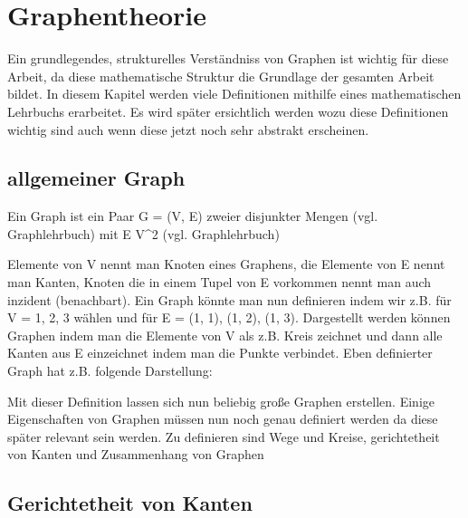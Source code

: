 \section{Graphentheorie}

Ein grundlegendes, strukturelles Verständniss von Graphen ist wichtig für diese Arbeit, da diese mathematische Struktur
die Grundlage der gesamten Arbeit bildet. In diesem Kapitel werden viele Definitionen mithilfe eines mathematischen
Lehrbuchs erarbeitet. Es wird später ersichtlich werden wozu diese Definitionen wichtig sind auch wenn diese jetzt noch
sehr abstrakt erscheinen.

\subsection{allgemeiner Graph}

Ein Graph ist ein Paar \textrm{G = (V, E)} zweier disjunkter Mengen (vgl. Graphlehrbuch) mit E \subseteq V^2 (vgl. Graphlehrbuch)

Elemente von V nennt man Knoten eines Graphens, die Elemente von E nennt man Kanten, Knoten die in einem Tupel von E vorkommen
nennt man auch inzident (benachbart).
Ein Graph könnte man nun definieren indem wir z.B. für V = {1, 2, 3} wählen und für E = {(1, 1), (1, 2), (1, 3)}.
Dargestellt werden können Graphen indem man die Elemente von V als z.B. Kreis zeichnet und dann alle Kanten aus E
einzeichnet indem man die Punkte verbindet. Eben definierter Graph hat z.B. folgende Darstellung:

\begin{center}
\end{center}

Mit dieser Definition lassen sich nun beliebig große Graphen erstellen.
Einige Eigenschaften von Graphen müssen nun noch genau definiert werden da diese später relevant sein werden.
Zu definieren sind Wege und Kreise, gerichtetheit von Kanten und Zusammenhang von Graphen

\subsection{Gerichtetheit von Kanten}

